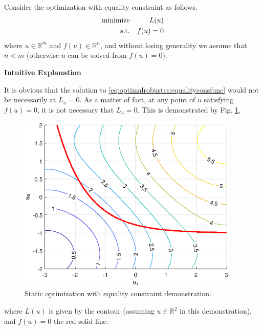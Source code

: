 Consider the optimization with equality constraint as follows.
\begin{eqnarray}
	\textup{minimize} && L(u) \label{eq:optimalrobustcs:equalityconsfunc} \\
	\textup{s.t.} && f(u) = 0 \label{eq:optimalrobustcs:equalityconstraint}
\end{eqnarray}
where $u\in\mathbb{R}^m$ and $f(u)\in\mathbb{R}^n$, and without losing generality we assume that $n<m$ (otherwise $u$ can be solved from $f(u)=0$).

\vspace{0.1in}
\noindent \textbf{Intuitive Explanation}
\vspace{0.1in}

It is obvious that the solution to \eqref{eq:optimalrobustcs:equalityconsfunc} would not be necessarily at $L_u=0$. As a matter of fact, at any point of $u$ satisfying $f(u)=0$, it is not necessary that $L_u=0$. This is demonstrated by Fig. \ref{fig:optimalrobustcs:opt_equalityconstraint_contour},
\begin{figure}
	\centering
	\includegraphics[width=300pt]{chapters/ch-optimal-robust-control-system/figures/opt_equalityconstraint_contour.eps}
	\caption{Static optimization with equality constraint demonstration.} \label{fig:optimalrobustcs:opt_equalityconstraint_contour}
\end{figure}
where $L(u)$ is given by the contour (assuming $u\in\mathbb{R}^2$ in this demonstration), and $f(u)=0$ the red solid line.

